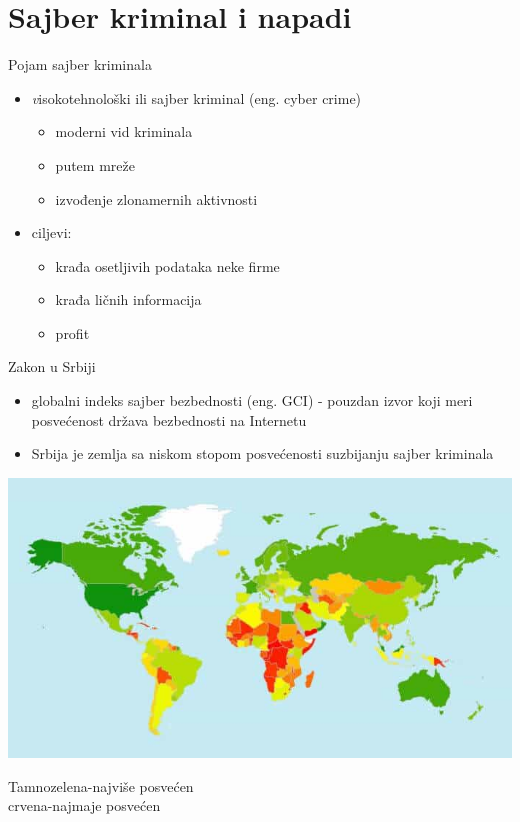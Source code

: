 \section{Sajber kriminal i napadi}

\begin{frame}{Pojam sajber kriminala}
        
        \begin{itemize}
        	\item \textit visokotehnološki ili sajber kriminal (eng. cyber crime)
        	\begin{itemize} 
	        	\item moderni vid kriminala
    	    	\item putem mreže 
        		\item izvođenje zlonamernih aktivnosti
            \end{itemize}
			\item ciljevi:
				\begin{itemize}
					\item krađa osetljivih podataka neke firme
					\item krađa ličnih informacija 
					\item profit
            	\end{itemize}
        \end{itemize}
    \end{frame}
    
    
   \begin{frame}{Zakon u Srbiji}
    \begin{itemize}
    \item globalni indeks sajber bezbednosti (eng. GCI) - pouzdan izvor koji meri posvećenost država bezbednosti na Internetu 
    \item Srbija je zemlja sa niskom stopom posvećenosti suzbijanju sajber kriminala
    \end{itemize}
	\begin{minipage}{0.3\textwidth}
        \includegraphics[scale = 0.25]{itu_worldmap.jpg}
        \end{minipage}
        \begin{minipage}{0.6\textwidth}\raggedleft
        Tamnozelena-najviše posvećen\\
        crvena-najmaje posvećen\\
        \end{minipage}
     
    \end{frame}
    
